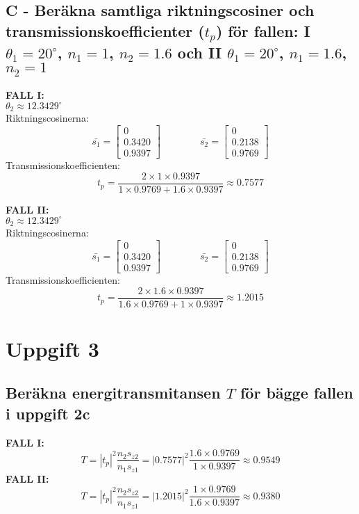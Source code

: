 \documentclass{article}
\begin{document}
  \subsection*{C - Beräkna samtliga riktningscosiner och transmissionskoefficienter ($t_p$) för fallen: \textbf{I} $\theta_1=20^{\circ}$, $n_1=1$, $n_2=1.6$ och \textbf{II} $\theta_1=20^{\circ}$, $n_1=1.6$, $n_2=1$}
    \textbf{FALL I:}\\
    $\theta_2\approx12.3429^{\circ}$\\
    Riktningscosinerna:
    \[
      \bar{s_1} =
      \begin{bmatrix}
        0\\0.3420\\0.9397
      \end{bmatrix}
      \qquad\qquad
      \bar{s_2} =
      \begin{bmatrix}
        0\\0.2138\\0.9769
      \end{bmatrix}
    \]
    Transmissionskoefficienten:
    \[
      t_p = \frac{2\times1\times0.9397}{1\times0.9769+1.6\times0.9397}\approx0.7577
    \]

    \textbf{FALL II:}\\
    $\theta_2\approx12.3429^{\circ}$\\
    Riktningscosinerna:
    \[
      \bar{s_1} =
      \begin{bmatrix}
        0\\0.3420\\0.9397
      \end{bmatrix}
      \qquad\qquad
      \bar{s_2} =
      \begin{bmatrix}
        0\\0.2138\\0.9769
      \end{bmatrix}
    \]
    Transmissionskoefficienten:
    \[
      t_p = \frac{2\times1.6\times0.9397}{1.6\times0.9769+1\times0.9397}\approx1.2015
    \]

\section*{Uppgift 3}
  \subsection*{Beräkna energitransmitansen $T$ för bägge fallen i uppgift 2c}
    \textbf{FALL I:}
    \[
      T=|t_p|^2\frac{n_2s_{z2}}{n_1s_{z1}}=|0.7577|^2\frac{1.6\times0.9769}{1\times0.9397}\approx0.9549
    \]
    \textbf{FALL II:}
    \[
      T=|t_p|^2\frac{n_2s_{z2}}{n_1s_{z1}}=|1.2015|^2\frac{1\times0.9769}{1.6\times0.9397}\approx0.9380
    \]
\end{document}
